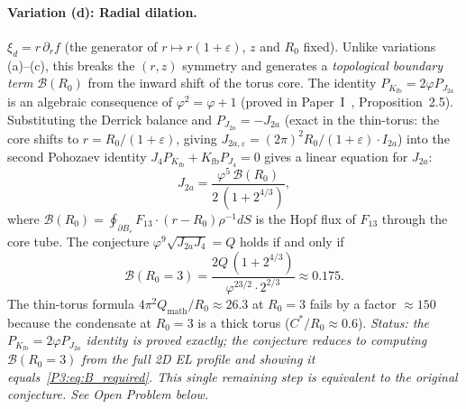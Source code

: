 \documentclass[11pt,a4paper]{article}
\theoremstyle{definition}
\theoremstyle{remark}
\newcommand{\vp}{\varphi}
\newcommand{\Kfb}{K_{\mathrm{fb}}}
\newcommand{\Ja}{J_{2a}}
\newcommand{\Jfour}{J_{4}}
\begin{document}
\paragraph{Variation (d): Radial dilation.}
\label{P3:sec:pohozaev_d}
$\xi_d = r\,\partial_r f$ (the generator of $r\mapsto r(1+\varepsilon)$,
$z$ and $R_0$ fixed).
Unlike variations (a)--(c), this breaks the $(r,z)$ symmetry and
generates a \emph{topological boundary term} $\mathcal{B}(R_0)$ from
the inward shift of the torus core.
The identity $P_{\Kfb}=2\vp P_{\Ja}$ is an algebraic consequence
of $\vp^2=\vp+1$ (proved in Paper~I~\cite{Paper1},
Proposition~2.5).
Substituting the Derrick balance and $P_{\Ja}=-\Ja$ (exact in the
thin-torus: the core shifts to $r=R_0/(1+\varepsilon)$, giving
$J_{2a,\varepsilon}=(2\pi)^2 R_0/(1+\varepsilon)\cdot I_{2a}$)
into the second Pohozaev identity $\Jfour P_{\Kfb}+\Kfb P_{\Jfour}=0$
gives a linear equation for $\Ja$:
\begin{equation}
  \Ja = \frac{\vp^5\,\mathcal{B}(R_0)}{2\,(1+2^{4/3})},
  \label{P3:eq:Ja_from_poh_d}
\end{equation}
where $\mathcal{B}(R_0)=\oint_{\partial B_\varepsilon}F_{13}\cdot(r-R_0)\rho^{-1}dS$
is the Hopf flux of $F_{13}$ through the core tube.
The conjecture $\vp^9\sqrt{\Ja\Jfour}=Q$ holds if and only if
\begin{equation}
  \mathcal{B}(R_0=3) = \frac{2Q\,(1+2^{4/3})}{\vp^{23/2}\cdot 2^{2/3}}
  \approx 0.175.
  \label{P3:eq:B_required}
\end{equation}
The thin-torus formula $4\pi^2 Q_{\mathrm{math}}/R_0\approx26.3$
at $R_0=3$ fails by a factor $\approx150$ because the condensate
at $R_0=3$ is a thick torus ($C^*/R_0\approx0.6$).
\emph{Status: the $P_{\Kfb}=2\vp P_{\Ja}$ identity is proved exactly;
the conjecture reduces to computing $\mathcal{B}(R_0=3)$ from the
full 2D EL profile and showing it equals~\eqref{P3:eq:B_required}.
This single remaining step is equivalent to the original conjecture.
See Open Problem below.}
\end{document}
